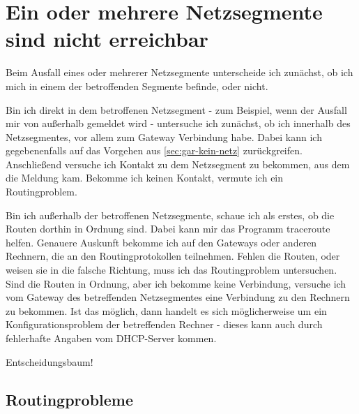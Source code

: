
\section{Ein oder mehrere Netzsegmente sind nicht erreichbar}
\label{sec:ausfall-netzsegment}

\begin{normaltext}
  Beim Ausfall eines oder mehrerer Netzsegmente unterscheide ich zunächst, ob
  ich mich in einem der betroffenden Segmente befinde, oder nicht.

  Bin ich direkt in dem betroffenen Netzsegment - zum Beispiel, wenn der
  Ausfall mir von außerhalb gemeldet wird - untersuche ich zunächst, ob ich
  innerhalb des Netzsegmentes, vor allem zum Gateway Verbindung habe.
  Dabei kann ich gegebenenfalls auf das Vorgehen aus
  \ref{sec:gar-kein-netz} zurückgreifen.
  Anschließend versuche ich Kontakt zu dem Netzsegment zu bekommen, aus dem
  die Meldung kam. Bekomme ich keinen Kontakt, vermute ich ein Routingproblem.

  Bin ich außerhalb der betroffenen Netzsegmente, schaue ich als erstes, ob
  die Routen dorthin in Ordnung sind. Dabei kann mir das Programm traceroute
  helfen. Genauere Auskunft bekomme ich auf den Gateways oder anderen
  Rechnern, die an den Routingprotokollen teilnehmen. Fehlen die Routen, oder
  weisen sie in die falsche Richtung, muss ich das Routingproblem untersuchen.
  Sind die Routen in Ordnung, aber ich bekomme keine Verbindung, versuche ich
  vom Gateway des betreffenden Netzsegmentes eine Verbindung zu den Rechnern
  zu bekommen. Ist das möglich, dann handelt es sich möglicherweise um ein
  Konfigurationsproblem der betreffenden Rechner - dieses kann auch durch
  fehlerhafte Angaben vom DHCP-Server kommen.
\end{normaltext}

\begin{notes}
\item Entscheidungsbaum!
\end{notes}

\subsection{Routingprobleme}
\label{sec:routingprobleme}

